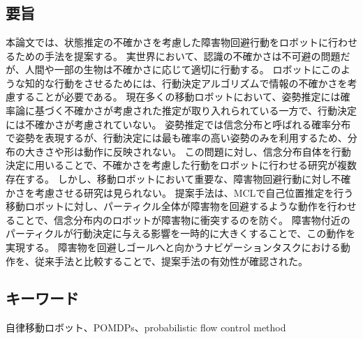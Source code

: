 \chapter*{}

\section*{要旨}
本論文では、状態推定の不確かさを考慮した障害物回避行動をロボットに行わせるための手法を提案する。
実世界において、認識の不確かさは不可避の問題だが、人間や一部の生物は不確かさに応じて適切に行動する。
ロボットにこのような知的な行動をさせるためには、行動決定アルゴリズムで情報の不確かさを考慮することが必要である。
現在多くの移動ロボットにおいて、姿勢推定には確率論に基づく不確かさが考慮された推定が取り入れられている一方で、行動決定には不確かさが考慮されていない。
姿勢推定では信念分布と呼ばれる確率分布で姿勢を表現するが、行動決定には最も確率の高い姿勢のみを利用するため、分布の大きさや形は動作に反映されない。
この問題に対し、信念分布自体を行動決定に用いることで、不確かさを考慮した行動をロボットに行わせる研究が複数存在する。
しかし、移動ロボットにおいて重要な、障害物回避行動に対し不確かさを考慮させる研究は見られない。
提案手法は、MCLで自己位置推定を行う移動ロボットに対し、パーティクル全体が障害物を回避するような動作を行わせることで、信念分布内のロボットが障害物に衝突するのを防ぐ。
障害物付近のパーティクルが行動決定に与える影響を一時的に大きくすることで、この動作を実現する。
障害物を回避しゴールへと向かうナビゲーションタスクにおける動作を、従来手法と比較することで、提案手法の有効性が確認された。

\section*{キーワード}
自律移動ロボット、POMDPs、probabilistic flow control method
